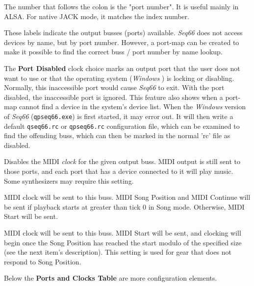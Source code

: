    The number that follows the colon is the "port number".
   It is useful mainly in ALSA.
   For native JACK mode, it matches the index number.

   These labels indicate the output busses (ports) available.
   \textsl{Seq66} does not access devices by name, but by port number.
   However, a port-map can be created to make it possible to find the correct
   buss / port number by name lookup.

   The \textbf{Port Disabled} clock choice marks an output port
   that the user does not want to use or that the operating system
   (\textsl{Windows} \smiley)
   is locking or disabling.
   Normally, this inaccessible port would cause \textsl{Seq66} to exit.
   With the port disabled, the inaccessible port is ignored.
   This feature also shows when a port-map cannot find a device in the system's
   device list.
   When the \textsl{Windows} version of \textsl{Seq66}
   (\texttt{qpseq66.exe}) is first started, it may error out.
   It will then write a default \texttt{qseq66.rc}
   or \texttt{qpseq66.rc} configuration file,
   which can be examined to find the offending buss, which can then be
   marked in the normal 'rc' file as disabled.

   Disables the MIDI \textsl{clock} for the given output buss.
   MIDI output is still sent to those ports, and
   each port that has a device connected to it will play music.
   Some synthesizers may require this setting.

   MIDI clock will be sent to this buss.
   MIDI Song Position and MIDI Continue will be sent if playback starts
   at greater than tick 0 in Song mode.  Otherwise, MIDI Start will be sent.

   MIDI clock will be sent to this buss.
   MIDI Start will be sent, and clocking will begin
   once the Song Position has reached the start modulo of the specified size
   (see the next item's description).
   This setting is used for gear that does not respond to Song Position.

   Below the \textbf{Ports and Clocks Table} are more configuration elements.

   \setcounter{ItemCounter}{0}      %

